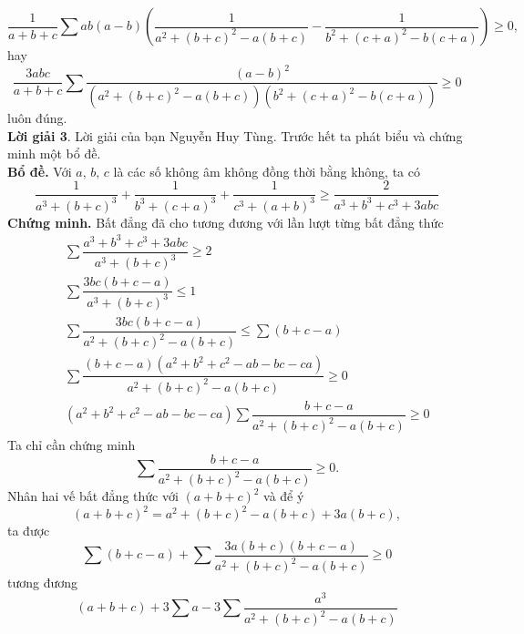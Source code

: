 \begin{bt}
{\begin{displaymath}
\dfrac{1}{a+b+c}\sum ab(a-b)\left(\dfrac{1}{a^2+(b+c)^2-a(b+c)}-\dfrac{1}{b^2+(c+a)^2-b(c+a)}\right)\geq 0,
\end{displaymath}
hay
\begin{displaymath}
\dfrac{3abc}{a+b+c}\sum\dfrac{\left(a-b\right)^2}{\left(a^2+(b+c)^2-a(b+c)\right)\left(b^2+(c+a)^2-b(c+a)\right)}\geq 0
\end{displaymath}
luôn đúng.\\
{\bf{Lời giải 3}}. Lời giải của bạn Nguyễn Huy Tùng. Trước hết ta phát biểu và chứng minh một bổ đề.\\
{\bf{Bổ đề.}} Với $a,\,b,\,c$ là các số không âm không đồng thời bằng không, ta có
\begin{displaymath}
\dfrac{1}{a^3+\left(b+c\right)^3}+\dfrac{1}{b^3+\left(c+a\right)^3}+\dfrac{1}{c^3+\left(a+b\right)^3}\geq \dfrac{2}{a^3+b^3+c^3+3abc}
\end{displaymath}
{\bf{Chứng minh.}} Bất đẳng đã cho tương đương với lần lượt từng bất đẳng thức
\begin{eqnarray*}
&&\sum\dfrac{a^3+b^3+c^3+3abc}{a^3+\left(b+c\right)^3}\geq 2\\
&&\sum\dfrac{3bc\left(b+c-a\right)}{a^3+\left(b+c\right)^3}\leq 1\\
&&\sum\dfrac{3bc\left(b+c-a\right)}{a^2+\left(b+c\right)^2-a\left(b+c\right)}\leq\sum\left(b+c-a\right)\\
&&\sum\dfrac{\left(b+c-a\right)\left(a^2+b^2+c^2-ab-bc-ca\right)}{a^2+\left(b+c\right)^2-a\left(b+c\right)}\geq 0\\
&&\left(a^2+b^2+c^2-ab-bc-ca\right)\sum\dfrac{b+c-a}{a^2+\left(b+c\right)^2-a\left(b+c\right)}\geq 0
\end{eqnarray*}
Ta chỉ cần chứng minh
\begin{displaymath}
\sum\dfrac{b+c-a}{a^2+\left(b+c\right)^2-a\left(b+c\right)}\geq 0.
\end{displaymath}
Nhân hai vế bất đẳng thức với $\left(a+b+c\right)^2$ và để ý
\begin{displaymath}
\left(a+b+c\right)^2=a^2+\left(b+c\right)^2-a\left(b+c\right)+3a\left(b+c\right),
\end{displaymath}
ta được
\begin{displaymath}
\sum\left(b+c-a\right)+\sum\dfrac{3a\left(b+c\right)\left(b+c-a\right)}{a^2+\left(b+c\right)^2-a\left(b+c\right)}\geq 0
\end{displaymath}
tương đương
\begin{displaymath}
\left(a+b+c\right)+3\sum a-3\sum\dfrac{a^3}{a^2+\left(b+c\right)^2-a\left(b+c\right)}

\end{displaymath}}
\end{bt}
